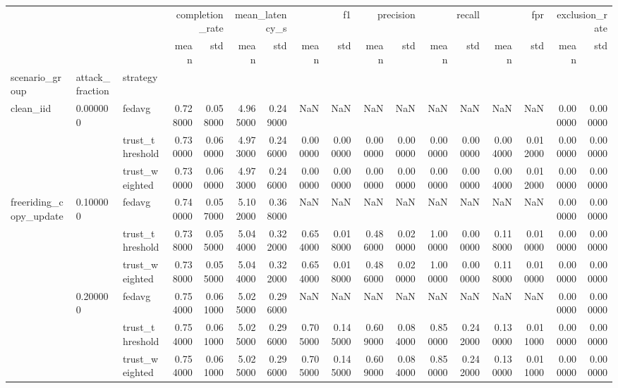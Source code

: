 \begin{tabular}{lllrrrrrrrrrrrrrr}
\toprule
 &  &  & \multicolumn{2}{r}{completion_rate} & \multicolumn{2}{r}{mean_latency_s} & \multicolumn{2}{r}{f1} & \multicolumn{2}{r}{precision} & \multicolumn{2}{r}{recall} & \multicolumn{2}{r}{fpr} & \multicolumn{2}{r}{exclusion_rate} \\
 &  &  & mean & std & mean & std & mean & std & mean & std & mean & std & mean & std & mean & std \\
scenario_group & attack_fraction & strategy &  &  &  &  &  &  &  &  &  &  &  &  &  &  \\
\midrule
\multirow[t]{3}{*}{clean_iid} & \multirow[t]{3}{*}{0.000000} & fedavg & 0.728000 & 0.058000 & 4.965000 & 0.249000 & NaN & NaN & NaN & NaN & NaN & NaN & NaN & NaN & 0.000000 & 0.000000 \\
 &  & trust_threshold & 0.730000 & 0.060000 & 4.973000 & 0.246000 & 0.000000 & 0.000000 & 0.000000 & 0.000000 & 0.000000 & 0.000000 & 0.004000 & 0.012000 & 0.000000 & 0.000000 \\
 &  & trust_weighted & 0.730000 & 0.060000 & 4.973000 & 0.246000 & 0.000000 & 0.000000 & 0.000000 & 0.000000 & 0.000000 & 0.000000 & 0.004000 & 0.012000 & 0.000000 & 0.000000 \\
\cline{1-17} \cline{2-17}
\multirow[t]{12}{*}{freeriding_copy_update} & \multirow[t]{3}{*}{0.100000} & fedavg & 0.740000 & 0.057000 & 5.102000 & 0.368000 & NaN & NaN & NaN & NaN & NaN & NaN & NaN & NaN & 0.000000 & 0.000000 \\
 &  & trust_threshold & 0.738000 & 0.055000 & 5.044000 & 0.322000 & 0.654000 & 0.018000 & 0.486000 & 0.020000 & 1.000000 & 0.000000 & 0.118000 & 0.010000 & 0.000000 & 0.000000 \\
 &  & trust_weighted & 0.738000 & 0.055000 & 5.044000 & 0.322000 & 0.654000 & 0.018000 & 0.486000 & 0.020000 & 1.000000 & 0.000000 & 0.118000 & 0.010000 & 0.000000 & 0.000000 \\
\cline{2-17}
 & \multirow[t]{3}{*}{0.200000} & fedavg & 0.754000 & 0.061000 & 5.025000 & 0.296000 & NaN & NaN & NaN & NaN & NaN & NaN & NaN & NaN & 0.000000 & 0.000000 \\
 &  & trust_threshold & 0.754000 & 0.061000 & 5.025000 & 0.296000 & 0.705000 & 0.145000 & 0.609000 & 0.084000 & 0.850000 & 0.242000 & 0.130000 & 0.011000 & 0.000000 & 0.000000 \\
 &  & trust_weighted & 0.754000 & 0.061000 & 5.025000 & 0.296000 & 0.705000 & 0.145000 & 0.609000 & 0.084000 & 0.850000 & 0.242000 & 0.130000 & 0.011000 & 0.000000 & 0.000000 \\

\end{tabular}
